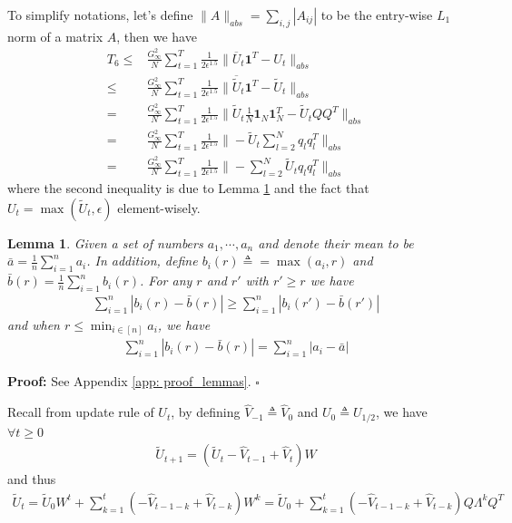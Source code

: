 \documentclass{article} %
\newtheorem{lemma}{Lemma}
\begin{document}
To simplify notations, let's define $\|A\|_{abs} = \sum_{i,j} |A_{ij}|$ to be the entry-wise $L_1$ norm of a matrix $A$, then we have
\begin{align}
T_6 \leq & \frac{G_{\infty}^2}{N}\sum_{t=1}^T \frac{1}{2\epsilon^{1.5}} \|\overline U_{t} \mathbf{1}^T - U_t \|_{abs} \nonumber \\
\leq & \frac{G_{\infty}^2}{N}\sum_{t=1}^T \frac{1}{2\epsilon^{1.5}} \|\overline{ \tilde U}_{t} \mathbf{1}^T - \tilde{U}_t \|_{abs} \nonumber \\
= & \frac{G_{\infty}^2}{N}\sum_{t=1}^T \frac{1}{2\epsilon^{1.5}} \|  \tilde U_{t} \frac{1}{N} \mathbf{1}_N\mathbf{1}_N^T - \tilde U_t Q Q^T \|_{abs} \nonumber \\
= & \frac{G_{\infty}^2}{N}\sum_{t=1}^T \frac{1}{2\epsilon^{1.5}}  \| - \tilde U_t \sum_{l=2}^N    q_l q_l^T \|_{abs} \nonumber \\
= & \frac{G_{\infty}^2}{N}\sum_{t=1}^T \frac{1}{2\epsilon^{1.5}}  \| - \sum_{l=2}^N   \tilde U_t q_l q_l^T \|_{abs} \nonumber 
\end{align}
where the second inequality is due to Lemma \ref{lem: mean_after_max} and the fact that $U_t = \max(\tilde U_t,\epsilon)$ element-wisely.
\begin{lemma}\label{lem: mean_after_max}
	Given  a set of numbers $a_1,\cdots,a_n$ and denote their mean to be $\bar a = \frac{1}{n}\sum_{i=1}^n a_i$. In addition, define $b_i(r) \triangleq = \max(a_i,r)$ and $\bar b (r) =  \frac{1}{n}\sum_{i=1}^n b_i(r)$. For any $r$ and $r'$ with $r' \geq r$ we have 
	\begin{align}\label{eq: r_decrease}
	\sum_{i=1}^n |b_i(r) - \bar b(r)| \geq \sum_{i=1}^n |b_i(r') - \bar b(r')|
	\end{align}
	and when $r \leq \min_{i \in [n]} a_i$, we have
	\begin{align}\label{eq: r_reduce}
	\sum_{i=1}^n |b_i(r) - \bar b(r)| =   \sum_{i=1}^n |a_i - \bar a|
	\end{align}
\end{lemma}
\textbf{Proof:} See Appendix \ref{app: proof_lemmas}. \hfill $\square$ 

Recall from update rule of $U_t$, by defining $\hat V_{-1} \triangleq \hat V_{0}$ and $U_0 \triangleq U_{1/2}$, we have $\forall t \geq 0$
\begin{align}
\tilde U_{t+1} = (\tilde U_t  - \hat V_{t-1} + \hat V_{t})W 
\end{align}
and thus 
\begin{align}
\tilde U_{t} = \tilde U_0 W^t + \sum_{k=1}^t (- \hat V_{t-1-k} + \hat V_{t-k} ) W^k =  \tilde U_0 + \sum_{k=1}^t (- \hat V_{t-1-k} + \hat V_{t-k} ) Q \Lambda^k Q^T
\end{align}
\end{document}
